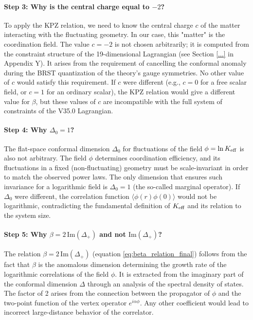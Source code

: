 \documentclass[12pt,a4paper]{article}
\newcommand{\Keff}[1][]{K_{\mathrm{eff}\if\relax\detokenize{#1}\relax\else,#1\fi}}   %
\begin{document}
	\paragraph{Step 3: Why is the central charge equal to \(-2\)?}
	To apply the KPZ relation, we need to know the central charge \(c\) of the matter interacting with the fluctuating geometry. In our case, this "matter" is the coordination field. The value \(c = -2\) is not chosen arbitrarily; it is computed from the constraint structure of the 19-dimensional Lagrangian (see Section \ref{...} in Appendix Y). It arises from the requirement of cancelling the conformal anomaly during the BRST quantization of the theory's gauge symmetries. No other value of \(c\) would satisfy this requirement. If \(c\) were different (e.g., \(c = 0\) for a free scalar field, or \(c = 1\) for an ordinary scalar), the KPZ relation would give a different value for \(\beta\), but these values of \(c\) are incompatible with the full system of constraints of the V35.0 Lagrangian.
	
	\paragraph{Step 4: Why \(\Delta_0 = 1\)?}
	The flat-space conformal dimension \(\Delta_0\) for fluctuations of the field \(\phi = \ln \Keff\) is also not arbitrary. The field \(\phi\) determines coordination efficiency, and its fluctuations in a fixed (non-fluctuating) geometry must be scale-invariant in order to match the observed power laws. The only dimension that ensures such invariance for a logarithmic field is \(\Delta_0 = 1\) (the so-called marginal operator). If \(\Delta_0\) were different, the correlation function \(\langle \phi(r)\phi(0) \rangle\) would not be logarithmic, contradicting the fundamental definition of \(\Keff\) and its relation to the system size.
	
	\paragraph{Step 5: Why \(\beta = 2\,\text{Im}(\Delta_+)\) and not \(\text{Im}(\Delta_+)\)?}
	The relation \(\beta = 2\,\text{Im}(\Delta_+)\) (equation \ref{eq:beta_relation_final}) follows from the fact that \(\beta\) is the anomalous dimension determining the growth rate of the logarithmic correlations of the field \(\phi\). It is extracted from the imaginary part of the conformal dimension \(\Delta\) through an analysis of the spectral density of states. The factor of 2 arises from the connection between the propagator of \(\phi\) and the two-point function of the vertex operator \(e^{i\alpha\phi}\). Any other coefficient would lead to incorrect large-distance behavior of the correlator.
	
\end{document}
